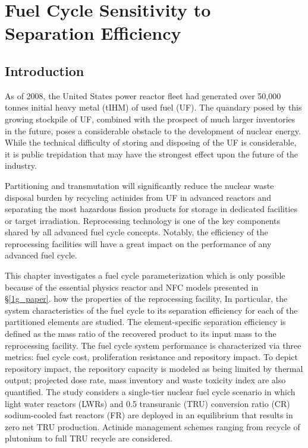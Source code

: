 \chapter{Fuel Cycle Sensitivity to Separation Efficiency}
\label{ses_paper}



\section{Introduction}
\label{ses_sec:intro}
As of 2008, the United States power reactor fleet had generated over
50,000 tonnes initial heavy metal (tIHM) of used fuel (UF). 
The quandary posed by this growing stockpile of UF, combined with the
prospect of much larger inventories in the future, poses a considerable
obstacle to the development of nuclear energy.  While the technical
difficulty of storing and disposing of the UF is considerable, it is
public trepidation that may have the strongest effect upon the future of
the industry.  

Partitioning and transmutation will significantly reduce the nuclear
waste disposal burden by recycling actinides from UF in advanced
reactors and separating the most hazardous fission products for storage
in dedicated facilities or target irradiation.  Reprocessing technology
is one of the key components shared by all advanced fuel cycle concepts.
 Notably, the efficiency of the reprocessing facilities will have a
great impact on the performance of any advanced fuel cycle. 

This chapter investigates a fuel cycle parameterization which is only possible 
because of the essential physics reactor and NFC models presented in \S \ref{1g_paper}.
how the properties of the reprocessing facility,
In particular, the system characteristics of the fuel cycle to its separation efficiency 
for each of the partitioned elements are studied. 
The element-specific separation efficiency is defined as the mass ratio of
the recovered product to its input mass to the reprocessing facility. 
The fuel cycle system performance is characterized via three metrics:
fuel cycle cost, proliferation resistance and repository impact.  To
depict repository impact, the repository capacity is modeled as being
limited by thermal output; projected dose rate, mass inventory and waste
toxicity index are also quantified.  The study considers a single-tier
nuclear fuel cycle scenario in which light water reactors (LWRs) and 0.5
transuranic (TRU) conversion ratio (CR) sodium-cooled fast reactors (FR) are
deployed in an equilibrium that results in zero net TRU production. 
Actinide management schemes ranging from recycle of plutonium to full
TRU recycle are considered.

